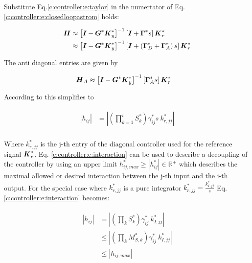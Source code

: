 Substitute Eq.\ref{c:controller:e:taylor} in the numertator of Eq. \ref{c:controller:e:closedloopastrom} holds:

\begin{align}
\begin{split}
\mbox{\boldmath$H$} &\approx \left[ \mbox{\boldmath$I$}  - \mbox{\boldmath$G$}^* \mbox{\boldmath$K$}_y^* \right]^{-1} \left[ \mbox{\boldmath$I$} +  \mbox{\boldmath$\Gamma$}^* s \right] \mbox{\boldmath$K$}_r^* \\
  &\approx \left[ \mbox{\boldmath$I$}  - \mbox{\boldmath$G$}^* \mbox{\boldmath$K$}_y^* \right]^{-1} \left[ \mbox{\boldmath$I$} + \left( \mbox{\boldmath$\Gamma$}^*_D + \mbox{\boldmath$\Gamma$}^*_A \right) s\right] \mbox{\boldmath$K$}_r^* \\
\end{split}
\end{align}

The anti diagonal entries are given by

\begin{align}
\begin{split}
\mbox{\boldmath$H$}_A &\approx \left[ \mbox{\boldmath$I$}  - \mbox{\boldmath$G$}^* \mbox{\boldmath$K$}_y^* \right]^{-1} \left[\mbox{\boldmath$\Gamma$}_A^* s \right] \mbox{\boldmath$K$}_r^*
\end{split}
\end{align}

According to \cite{Astrom2001a} this simplifies to

\begin{align}
\begin{split}
|h_{ij}| &= \left|\left(\prod_{k = 1}^{i} S_{k}^*\right)\gamma_{ij}^*s ~k^*_{r,jj} \right| \\
\end{split}
\label{c:controller:e:interaction}
\end{align}

Where $k^*_{r,jj}$ is the j-th entry of the diagonal controller used for the reference signal $\mbox{\boldmath$K$}_r^*$. Eq. \ref{c:controller:e:interaction} can be used to describe a decoupling of the controller by using an upper limit $h_{ij,max}^* \geq |h_{ij}^*| \in \mathbb{R}^+$ which describes the maximal allowed or desired interaction between the j-th input and the i-th output. For the special case where $k^*_{r,jj}$ is a pure integrator $k_{r,jj}^* = \frac{k_{I,jj}^*}{s}$ Eq. \ref{c:controller:e:interaction} becomes:

\begin{align}
\begin{split}
\left| h_{ij} \right| &= \left|\left(\prod_k S_k^*\right) \gamma^*_{ij}~ k^*_{I,jj} \right| \\
& \leq \left|\left(\prod_k M_{S,k}^*\right) \gamma^*_{ij}~ k^*_{I,jj} \right| \\
& \leq \left|h_{ij,max}\right|
\end{split}
\label{c:controller:e:setpointinteraction}
\end{align}

